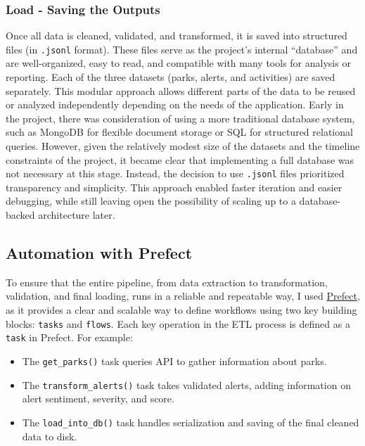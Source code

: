 \documentclass[
  letterpaper,
  DIV=11,
  numbers=noendperiod]{scrartcl}
\providecommand{\tightlist}{%
  \setlength{\itemsep}{0pt}\setlength{\parskip}{0pt}}\usepackage{longtable,booktabs,array}
\begin{document}
\subsubsection{Load - Saving the
Outputs}\label{load---saving-the-outputs}

Once all data is cleaned, validated, and transformed, it is saved into
structured files (in \texttt{.jsonl} format). These files serve as the
project's internal ``database'' and are well-organized, easy to read,
and compatible with many tools for analysis or reporting. Each of the
three datasets (parks, alerts, and activities) are saved separately.
This modular approach allows different parts of the data to be reused or
analyzed independently depending on the needs of the application. Early
in the project, there was consideration of using a more traditional
database system, such as MongoDB for flexible document storage or SQL
for structured relational queries. However, given the relatively modest
size of the datasets and the timeline constraints of the project, it
became clear that implementing a full database was not necessary at this
stage. Instead, the decision to use \texttt{.jsonl} files prioritized
transparency and simplicity. This approach enabled faster iteration and
easier debugging, while still leaving open the possibility of scaling up
to a database-backed architecture later.

\subsection{Automation with Prefect}\label{automation-with-prefect}

To ensure that the entire pipeline, from data extraction to
transformation, validation, and final loading, runs in a reliable and
repeatable way, I used \href{https://www.prefect.io/}{Prefect}, as it
provides a clear and scalable way to define workflows using two key
building blocks: \texttt{tasks} and \texttt{flows}. Each key operation
in the ETL process is defined as a \texttt{task} in Prefect. For
example:

\begin{itemize}
\tightlist
\item
  The \texttt{get\_parks()} task queries API to gather information about
  parks.
\item
  The \texttt{transform\_alerts()} task takes validated alerts, adding
  information on alert sentiment, severity, and score.
\item
  The \texttt{load\_into\_db()} task handles serialization and saving of
  the final cleaned data to disk.
\end{itemize}
\end{document}
